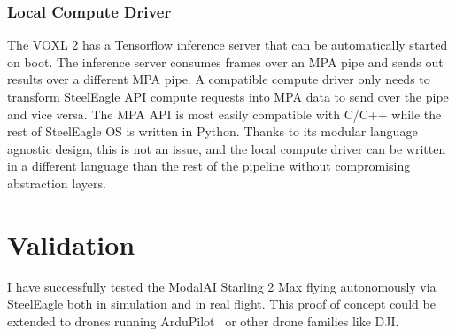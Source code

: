 \subsubsection{Local Compute Driver}
The VOXL 2 has a Tensorflow inference server that can be automatically started on boot. The inference server consumes frames over an MPA pipe and sends out results over a different MPA pipe. A compatible compute driver only needs to transform SteelEagle API compute requests into MPA data to send over the pipe and vice versa. The MPA API is most easily compatible with C/C++ while the rest of SteelEagle OS is written in Python. Thanks to its modular language agnostic design, this is not an issue, and the local compute driver can be written in a different language than the rest of the pipeline without compromising abstraction layers.

\section{Validation}
I have successfully tested the ModalAI Starling 2 Max flying autonomously via SteelEagle both in simulation and in real flight. This proof of concept could be extended to drones running ArduPilot~\cite{Ardupilot} or other drone families like DJI.
